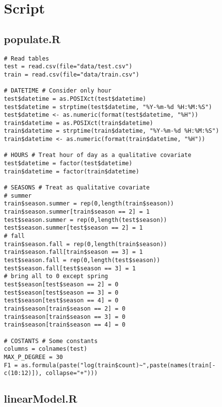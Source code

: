 \section{Script}\label{sec:script}

\subsection{populate.R}\label{sec:script-populate}
\begin{verbatim}
# Read tables
test = read.csv(file="data/test.csv")
train = read.csv(file="data/train.csv")

# DATETIME # Consider only hour
test$datetime = as.POSIXct(test$datetime)
test$datetime = strptime(test$datetime, "%Y-%m-%d %H:%M:%S")
test$datetime <- as.numeric(format(test$datetime, "%H"))
train$datetime = as.POSIXct(train$datetime)
train$datetime = strptime(train$datetime, "%Y-%m-%d %H:%M:%S")
train$datetime <- as.numeric(format(train$datetime, "%H"))

# HOURS # Treat hour of day as a qualitative covariate
test$datetime = factor(test$datetime)
train$datetime = factor(train$datetime)

# SEASONS # Treat as qualitative covariate
# summer
train$season.summer = rep(0,length(train$season))
train$season.summer[train$season == 2] = 1
test$season.summer = rep(0,length(test$season))
test$season.summer[test$season == 2] = 1
# fall
train$season.fall = rep(0,length(train$season))
train$season.fall[train$season == 3] = 1
test$season.fall = rep(0,length(test$season))
test$season.fall[test$season == 3] = 1
# bring all to 0 except spring
test$season[test$season == 2] = 0
test$season[test$season == 3] = 0
test$season[test$season == 4] = 0
train$season[train$season == 2] = 0
train$season[train$season == 3] = 0
train$season[train$season == 4] = 0

# COSTANTS # Some constants
columns = colnames(test)
MAX_P_DEGREE = 30
F1 = as.formula(paste("log(train$count)~",paste(names(train[-c(10:12)]), collapse="+")))

\end{verbatim}

\subsection{linearModel.R}\label{sec:script-linear-model}


